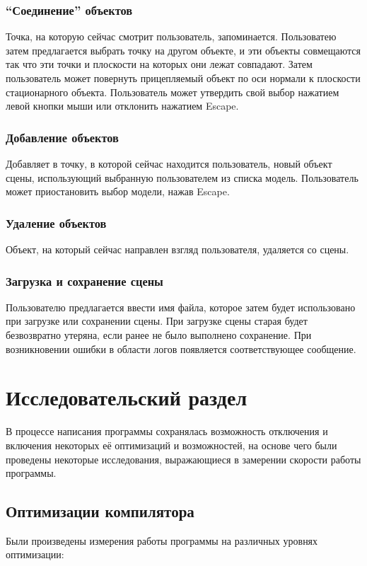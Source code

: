 \documentclass[a4paper,12pt]{report}
\numberwithin{equation}{section}
\begin{document}
\subsubsection{``Соединение'' объектов}
Точка, на которую сейчас смотрит пользователь, запоминается. Пользоватею затем предлагается выбрать точку на другом объекте, и эти объекты совмещаются так что эти точки и плоскости на которых они лежат совпадают. Затем пользователь может повернуть прицепляемый объект по оси нормали к плоскости стационарного объекта. Пользователь может утвердить свой выбор нажатием левой кнопки мыши или отклонить нажатием Escape.

\subsubsection{Добавление объектов}
Добавляет в точку, в которой сейчас находится пользователь, новый объект сцены, использующий выбранную пользователем из списка модель. Пользователь может приостановить выбор модели, нажав Escape.

\subsubsection{Удаление объектов}
Объект, на который сейчас направлен взгляд пользователя, удаляется со сцены.

\subsubsection{Загрузка и сохранение сцены}
Пользователю предлагается ввести имя файла, которое затем будет использовано при загрузке или сохранении сцены. При загрузке сцены старая будет безвозвратно утеряна, если ранее не было выполнено сохранение. При возникновении ошибки в области логов появляется соответствующее сообщение.

\section{Исследовательский раздел}
В процессе написания программы сохранялась возможность отключения и включения некоторых её оптимизаций и возможностей, на основе чего были проведены некоторые исследования, выражающиеся в замерении скорости работы программы.

\subsection{Оптимизации компилятора}
Были произведены измерения работы программы на различных уровнях оптимизации:
\end{document}
